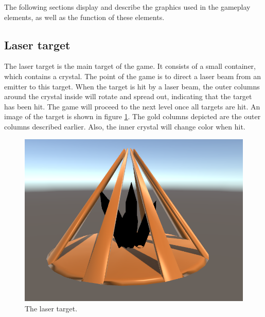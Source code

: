 		The following sections display and describe the graphics used in
		the gameplay elements, as well as the function of
		these elements.
		
		\subsection{Laser target} \label{ssec:lasertarget}
			The laser target is the main target of the game. It consists of
			a small container, which contains a crystal. The point of the
			game is to direct a laser beam from an emitter to this target.
			When the target is hit by a laser beam, the outer columns around
			the crystal inside will rotate and spread out, indicating that
			the target has been hit. The game will proceed to the
			next level once all targets are hit. An image of the target is shown in figure 
			\ref{fig:target}. The gold columns depicted are the outer columns
			described earlier. Also, the inner crystal will change color
			when hit.
			\begin{figure}[!ht]
				\centering
				\includegraphics[scale = 0.4]{Target}
				\caption{The laser target.}
				\label{fig:target}
			\end{figure}
			
